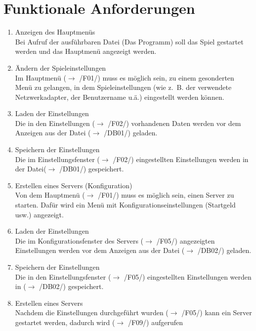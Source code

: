 \documentclass[a4paper,10pt]{article}
\begin{document}
\section{Funktionale Anforderungen}
\begin{enumerate}[/F01/]
\item Anzeigen des Hauptmenüs \\
Bei Aufruf der ausführbaren Datei (Das Programm) soll das Spiel gestartet werden und das Hauptmenü angezeigt werden.

\item Ändern der Spieleinstellungen \\
Im Hauptmenü ($\rightarrow$ /F01/) muss es möglich sein, zu einem gesonderten Menü zu gelangen, in dem Spieleinstellungen (wie z.~B. der verwendete Netzwerkadapter, der Benutzername u.ä.) eingestellt werden können.

\item Laden der Einstellungen \\
Die in den Einstellungen ($\rightarrow$ /F02/) vorhandenen Daten werden vor dem Anzeigen aus der Datei ($\rightarrow$ /DB01/) geladen.

\item Speichern der Einstellungen \\
Die im Einstellungsfenster ($\rightarrow$ /F02/) eingestellten Einstellungen werden in der Datei($\rightarrow$ /DB01/) gespeichert.

\item Erstellen eines Servers (Konfiguration) \\
Von dem Hauptmenü ($\rightarrow$ /F01/) muss es möglich sein, einen Server zu starten. Dafür wird ein Menü mit Konfigurationseinstellungen (Startgeld usw.) angezeigt.

\item Laden der Einstellungen \\
Die im Konfigurationsfenster des Servers ($\rightarrow$ /F05/) angezeigten Einstellungen werden vor dem Anzeigen aus der Datei ($\rightarrow$ /DB02/) geladen.

\item Speichern der Einstellungen \\
Die in den Einstellungsfenster ($\rightarrow$ /F05/) eingestellten Einstellungen werden in ($\rightarrow$ /DB02/) gespeichert.

\item Erstellen eines Servers \\
Nachdem die Einstellungen durchgeführt wurden ($\rightarrow$ /F05/) kann ein Server gestartet werden, dadurch wird ($\rightarrow$ /F09/) aufgerufen


\end{enumerate}
\end{document}
